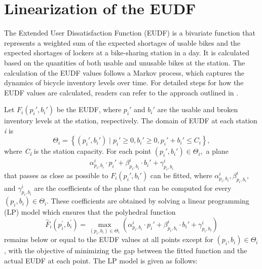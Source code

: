 
\chapter{Linearization of the EUDF}
\label{AppendixA}
\label{app:ch4-linearization-eudf}

The Extended User Dissatisfaction Function (EUDF) is a bivariate function that represents a weighted
sum of the expected shortages of usable bikes and the expected shortages of lockers at a
bike-sharing station in a day. It is calculated based on the quantities of both usable and unusable
bikes at the station. The calculation of the EUDF values follows a Markov process, which captures
the dynamics of bicycle inventory levels over time. For detailed steps for how the EUDF values are
calculated, readers can refer to the approach outlined in \citet{kaspiBikesharingSystemsUser2017}.

Let \(F_{i}\left( {p_{i}',b_{i}'} \right)\) be the EUDF, where \(p_{i}'\) and \(b_{i}'\) are the
usable and broken inventory levels at the station, respectively. The domain of EUDF at each station
\emph{i} is
\begin{equation}
\Theta_{i} =
\left\{
{\left( {p_{i}',b_{i}'} \right)
\mid p_{i}' \geq 0,b_{i}' \geq 0,p_{i}' + b_{i}' \leq C_{i}}
\right\},
\end{equation}
where \emph{C\textsubscript{i}} is the station capacity. For each point
\(\left( {p_{i}',b_{i}'} \right) \in \Theta_{i},\) a plane
\begin{equation}
\alpha_{p_{i},b_{i}}^{i} \cdot p_{i}'
+ \beta_{p_{i},b_{i}}^{i} \cdot b_{i}'
+ \gamma_{p_{i},b_{i}}^{i}
\end{equation}
that passes as close as possible to \(F_{i}\left( {p_{i}',b_{i}'} \right)\) can be fitted, where
\(\alpha_{p_{i},b_{i}}^{i},\beta_{p_{i},b_{i}}^{i},\) and \(\gamma_{p_{i},b_{i}}^{i}\) are the
coefficients of the plane that can be computed for every
\(\left( {p_{i},b_{i}} \right) \in \Theta_{i}\). These coefficients are obtained by solving a linear
programming (LP) model which ensures that the polyhedral function
\begin{equation}
{\overset{\sim}{F}}_{i}\left( {p_{i}^{'},b_{i}^{'}} \right)
=
\max\limits_{{({p_{i},b_{i}})} \in \Theta_i}
\left( {\alpha_{p_{i},b_{i}}^{i} \cdot p_{i}' + \beta_{p_{i},b_{i}}^{i} \cdot b_{i}' + \gamma_{p_{i},b_{i}}^{i}} \right)
\end{equation}
remains below or equal to the EUDF values at all points except for
\(\left( {p_{i},b_{i}} \right) \in \Theta_i\), with the objective of minimizing the gap between
the fitted function and the actual EUDF at each point. The LP model is given as follows:

